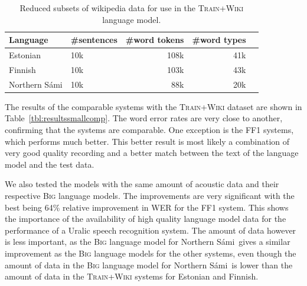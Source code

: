 \documentclass[b5paper]{article}
\newcommand{\ns}{Northern Sámi}
\newcommand{\ds}[1]{\textsc{#1}}
\begin{document}
\begin{table}[!h]
\centering
\begin{tabular}{llrrr}
\textbf{Language} & \textbf{\#sentences} & \textbf{\#word tokens} & \textbf{\#word types}\\\hline
Estonian &   10k & 108k & 41k \\
 Finnish &   10k  & 103k & 43k \\
 \ns &  10k & 88k & 20k\\
\end{tabular}
\caption{Reduced subsets of wikipedia data for use in the \ds{Train+Wiki} language model.\label{tbl:lmdatacomp_small}}
\end{table}

The results of the comparable systems with the \ds{Train+Wiki} dataset are shown in Table~\ref{tbl:resultssmallcomp}. The word error rates are very close to another, confirming that the systems are comparable. One exception is the FF1 systems, which performs much better. This better result is most likely a combination of very good quality recording and a better match between the text of the language model and the test data.

We also tested the models with the same amount of acoustic data and their respective \ds{Big} language models. The improvements are very significant with the best being 64\% relative improvement in WER for the FF1 system. This shows the importance of the availability of high quality language model data for the performance of a Uralic speech recognition system. The amount of data however is less important, as the \ds{Big} language model for \ns\ gives a similar improvement as the \ds{Big} language models for the other systems, even though the amount of data in the \ds{Big} language model for \ns\ is lower than the amount of data in the \ds{Train+Wiki} systems for Estonian and Finnish.
\end{document}
